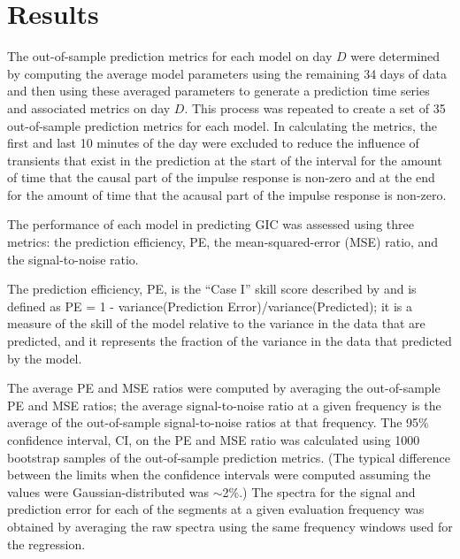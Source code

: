 \documentclass[draft,linenumbers]{agujournal2018}
\begin{document}
\section{Results}

The out-of-sample prediction metrics for each model on day $D$ were determined by computing the average model parameters using the remaining 34 days of data and then using these averaged parameters to generate a prediction time series and associated metrics on day $D$. This process was repeated to create a set of 35 out-of-sample prediction metrics for each model. In calculating the metrics, the first and last 10 minutes of the day were excluded to reduce the influence of transients that exist in the prediction at the start of the interval for the amount of time that the causal part of the impulse response is non-zero and at the end for the amount of time that the acausal part of the impulse response is non-zero. 

The performance of each model in predicting GIC was assessed using three metrics: the prediction efficiency, PE, the mean-squared-error (MSE) ratio, and the signal-to-noise ratio.

The prediction efficiency, PE, is the ``Case I'' skill score described by \cite{Murphy1988} and is defined as PE = 1 - variance(Prediction Error)/variance(Predicted); it is a measure of the skill of the model relative to the variance in the data that are predicted, and it represents the fraction of the variance in the data that predicted by the model.

The average PE and MSE ratios were computed by averaging the out-of-sample PE and MSE ratios; the average signal-to-noise ratio at a given frequency is the average of the out-of-sample signal-to-noise ratios at that frequency. The 95\% confidence interval, CI, on the PE and MSE ratio was calculated using 1000 bootstrap samples of the out-of-sample prediction metrics. (The typical difference between the limits when the confidence intervals were computed assuming the values were Gaussian-distributed was $\sim$2\%.) The spectra for the signal and prediction error for each of the segments at a given evaluation frequency was obtained by averaging the raw spectra using the same frequency windows used for the regression. 
\end{document}
